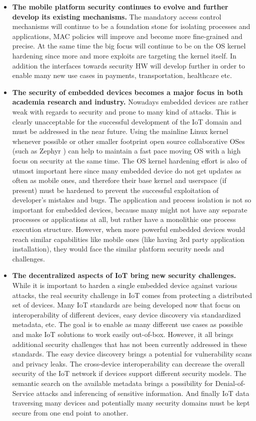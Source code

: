 \begin{itemize}
	\item \textbf{The mobile platform security continues to evolve and further develop its existing mechanisms.} The mandatory access control mechanisms will continue to be a foundation stone for isolating processes and applications, MAC policies will improve and become more fine-grained and precise. At the same time the big focus will continue to be on the OS kernel hardening since more and more exploits are targeting the kernel itself. In addition the interfaces towards security HW will develop further in order to enable many new use cases in payments, transportation, healthcare etc.  
	\item \textbf{The security of embedded devices becomes a major focus in both academia research and industry.} Nowadays embedded devices are rather weak with regards to security and prone to many kind of attacks. This is clearly unacceptable for the successful development of the IoT domain and must be addressed in the near future. Using the mainline Linux kernel whenever possible or other smaller footprint open source collaborative OSes (such as Zephyr ) can help to maintain a fast pace moving OS with a high focus on security at the same time. The OS kernel hardening effort is also of utmost important here since many embedded device do not get updates as often as mobile ones, and therefore their base kernel and userspace (if present) must be hardened to prevent the successful exploitation of developer's mistakes and bugs. The application and process isolation is not so important for embedded devices, because many might not have any separate processes or applications at all, but rather have a monolithic one process execution structure. However, when more powerful embedded devices would reach similar capabilities like mobile ones (like having 3rd party application installation), they would face the similar platform security needs and challenges. 
	\item \textbf{The decentralized aspects of IoT bring new security challenges.} While it is important to harden a single embedded device against various attacks, the real security challenge in IoT comes from protecting a distributed set of devices. Many IoT standards are being developed now that focus on interoperability of different devices, easy device discovery via standardized metadata, etc. The goal is to enable as many different use cases as possible and make IoT solutions to work easily out-of-box. However, it all brings additional security challenges that has not been currently addressed in these standards. The easy device discovery brings a potential for vulnerability scans and privacy leaks. The cross-device interoperability can decrease the overall security of the IoT network if devices support different security models. The semantic search on the available metadata brings a possibility for Denial-of-Service attacks and inferencing of sensitive information. And finally IoT data traversing many devices and potentially many security domains must be kept secure from one end point to another.

\end{itemize}
